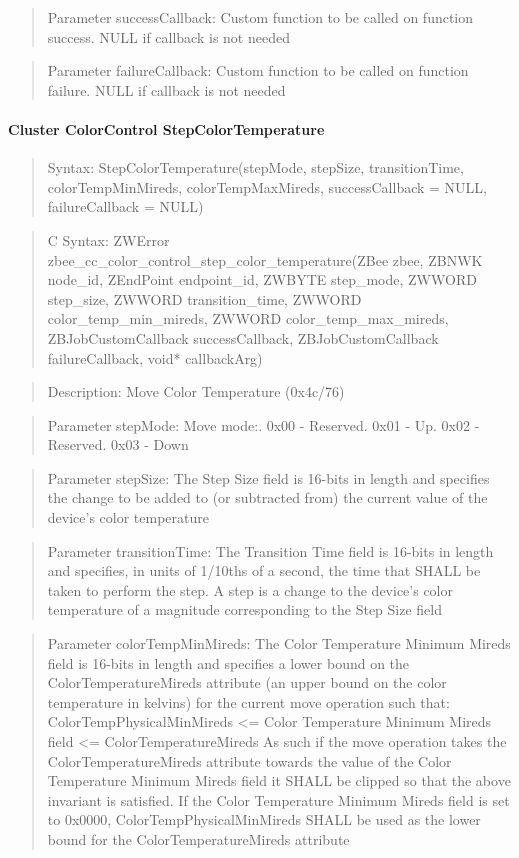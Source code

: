 \begin{quote}Parameter successCallback: Custom function to be called on function success. NULL if callback is not needed\end{quote}
\begin{quote}Parameter failureCallback: Custom function to be called on function failure. NULL if callback is not needed\end{quote}


\paragraph{Cluster ColorControl StepColorTemperature}
\begin{quote}Syntax: StepColorTemperature(stepMode, stepSize, transitionTime, colorTempMinMireds, colorTempMaxMireds, successCallback = NULL, failureCallback = NULL)\end{quote}
\begin{quote}C Syntax: ZWError zbee\_cc\_color\_control\_step\_color\_temperature(ZBee zbee, ZBNWK node\_id, ZEndPoint endpoint\_id, ZWBYTE step\_mode, ZWWORD step\_size, ZWWORD transition\_time, ZWWORD color\_temp\_min\_mireds, ZWWORD color\_temp\_max\_mireds, ZBJobCustomCallback successCallback, ZBJobCustomCallback failureCallback, void* callbackArg)\end{quote}
\begin{quote}Description: Move Color Temperature (0x4c/76)\end{quote}
\begin{quote}Parameter stepMode: Move mode:. 0x00 - Reserved. 0x01 - Up. 0x02 - Reserved. 0x03 - Down\end{quote}
\begin{quote}Parameter stepSize: The Step Size field is 16-bits in length and specifies the change to be added to (or subtracted from) the current value of the device’s color temperature\end{quote}
\begin{quote}Parameter transitionTime: The Transition Time field is 16-bits in length and specifies, in units of 1/10ths of a second, the time that SHALL be taken to perform the step. A step is a change to the device’s color temperature of a magnitude corresponding to the Step Size field\end{quote}
\begin{quote}Parameter colorTempMinMireds: The Color Temperature Minimum Mireds field is 16-bits in length and specifies a lower bound on the ColorTemperatureMireds attribute (an upper bound on the color temperature in kelvins) for the current move operation such that: ColorTempPhysicalMinMireds <= Color Temperature Minimum Mireds field <= ColorTemperatureMireds As such if the move operation takes the ColorTemperatureMireds attribute towards the value of the Color Temperature Minimum Mireds field it SHALL be clipped so that the above invariant is satisfied. If the Color Temperature Minimum Mireds field is set to 0x0000, ColorTempPhysicalMinMireds SHALL be used as the lower bound for the ColorTemperatureMireds attribute\end{quote}
